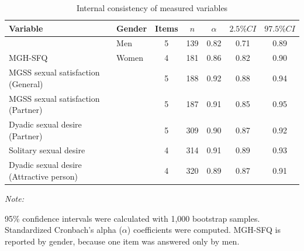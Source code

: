 \documentclass[
  bookmarksnumbered]{article}
\newenvironment{Shaded}{\begin{snugshade}}{\end{snugshade}}
\newcommand{\AttributeTok}[1]{\textcolor[rgb]{0.80,0.80,0.80}{#1}}
\newcommand{\ConstantTok}[1]{\textcolor[rgb]{0.86,0.64,0.64}{\textbf{#1}}}
\newcommand{\FunctionTok}[1]{\textcolor[rgb]{0.94,0.94,0.56}{#1}}
\newcommand{\NormalTok}[1]{\textcolor[rgb]{0.80,0.80,0.80}{#1}}
\newcommand{\SpecialCharTok}[1]{\textcolor[rgb]{0.86,0.64,0.64}{#1}}
\newcommand{\StringTok}[1]{\textcolor[rgb]{0.80,0.58,0.58}{#1}}
\begin{document}
\begin{Shaded}
\end{Shaded}

\begin{table}[H]
\centering
\caption{\label{tab:Cronbach-tab}Internal consistency of measured variables}
\centering
\begin{threeparttable}
\begin{tabular}[t]{llccccc}
\toprule
Variable & Gender & Items & $n$ & $\alpha$ & $2.5\% CI$ & $97.5\% CI$\\
\midrule
 & Men & 5 & 139 & 0.82 & 0.71 & 0.89\\
\cmidrule{2-7}
\multirow{-2}{*}{\raggedright\arraybackslash MGH-SFQ} & Women & 4 & 181 & 0.86 & 0.82 & 0.90\\
\cmidrule{1-7}
MGSS sexual satisfaction (General) &  & 5 & 188 & 0.92 & 0.88 & 0.94\\
\cmidrule{1-7}
MGSS sexual satisfaction (Partner) &  & 5 & 187 & 0.91 & 0.85 & 0.95\\
\cmidrule{1-7}
Dyadic sexual desire (Partner) &  & 5 & 309 & 0.90 & 0.87 & 0.92\\
\cmidrule{1-7}
Solitary sexual desire &  & 4 & 314 & 0.91 & 0.89 & 0.93\\
\cmidrule{1-7}
Dyadic sexual desire (Attractive person) &  & 4 & 320 & 0.89 & 0.87 & 0.91\\
\bottomrule
\end{tabular}
\begin{tablenotes}[para]
\item \textit{Note: } 
\item 95\% confidence intervals were calculated with 1,000 bootstrap samples.
           Standardized Cronbach's alpha ($\alpha$) coefficients were computed. 
           MGH-SFQ is reported by gender, because one item was answered only by men.
\end{tablenotes}
\end{threeparttable}
\end{table}
\end{document}

